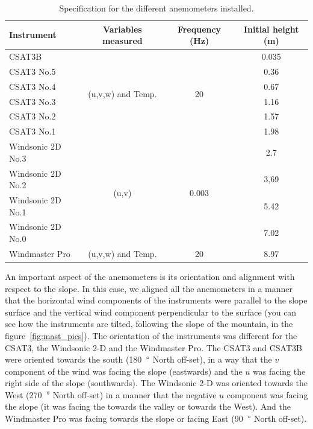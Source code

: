 \begin{table}[!ht]
    \centering
    \begin{tabular}{ | l | c | c | c |}
    \hline
    \textbf{Instrument} & \textbf{Variables measured} &  \textbf{Frequency (Hz)} & \textbf{Initial height (m)} \\ [0.5ex]  \hline\hline
    CSAT3B & \multirow{6}{*}{(u,v,w) and Temp.} & \multirow{6}{*}{20} & 0.035 \\
    CSAT3 No.5 &  &  & 0.36 \\
    CSAT3 No.4 &  &  & 0.67 \\
    CSAT3 No.3 &  &  & 1.16 \\
    CSAT3 No.2 &  &  & 1.57 \\
    CSAT3 No.1 &  &  & 1.98 \\
    \hline
    Windsonic 2D No.3 & \multirow{4}{*}{(u,v)} & \multirow{4}{*}{0.003} &  2.7\\
    Windsonic 2D No.2 &  &  &  3,69\\
    Windsonic 2D No.1 &  &  &  5.42\\
    Windsonic 2D No.0 &  &  &  7.02\\
    \hline
    Windmaster Pro & (u,v,w) and Temp. & 20 & 8.97 \\
    \hline
    
    \end{tabular}
    \caption{Specification for the different anemometers installed.}
    \label{tab:intruments_anemometers}
\end{table}

An important aspect of the anemometers is its orientation and alignment with respect to the slope. In this case, we aligned all the anemometers in a manner that the horizontal wind components of the instruments were parallel to the slope surface and the vertical wind component perpendicular to the surface (you can see how the instruments are tilted, following the slope of the mountain, in the figure~\ref{fig:mast_pics}). The orientation of the instruments was different for the CSAT3, the Windsonic 2-D and the Windmaster Pro. The CSAT3 and CSAT3B were oriented towards the south (180~$\degree$ North off-set), in a way that the $v$ component of the wind was facing the slope (eastwards) and the $u$ was facing the right side of the slope (southwards). The Windsonic 2-D was oriented towards the West (270~$\degree$ North off-set) in a manner that the negative $u$ component was facing the slope (it was facing the towards the valley or towards the West). And the Windmaster Pro was facing towards the slope or facing East (90~$\degree$ North off-set).

